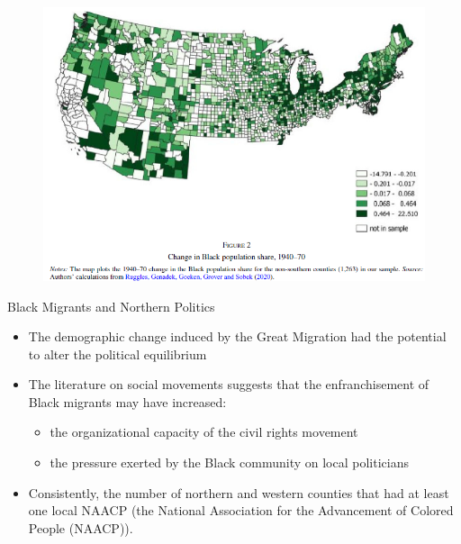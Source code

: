 \documentclass[dvipdfmx,11pt]{beamer}
\begin{document}
\begin{frame}{}
  \begin{figure}
    \centering
    \includegraphics[scale = .5]{fig_tab/os20220708/F2.png}
  \end{figure}
\end{frame}

\begin{frame}{Black Migrants and Northern Politics}
  \begin{itemize}
    \item The demographic change induced by the Great Migration had the potential to alter the political equilibrium
    \item The literature on social movements suggests that the enfranchisement of Black migrants may have increased:
    \begin{itemize}
      \item the organizational capacity of the civil rights movement
      \item the pressure exerted by the Black community on local politicians
    \end{itemize}
    \item Consistently, the number of northern and western counties that had at least one local NAACP (the
    National Association for the Advancement of Colored People (NAACP)).
  \end{itemize}
\end{frame}
\end{document}
